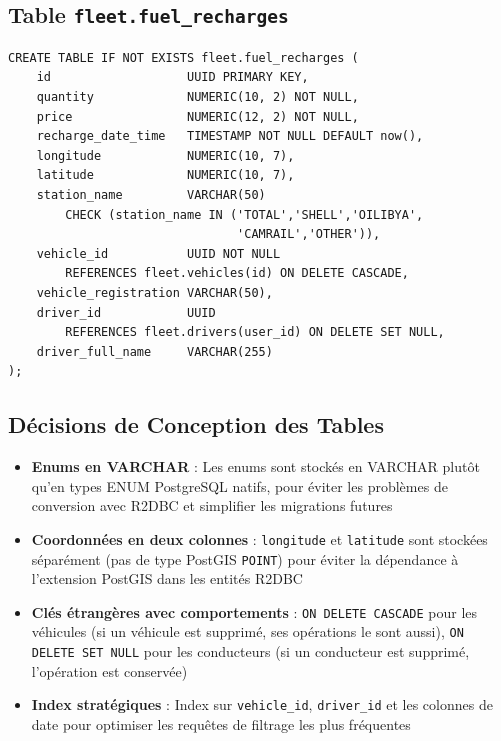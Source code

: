 \documentclass[12pt,a4paper]{report}
\begin{document}
\subsection{Table \texttt{fleet.fuel\_recharges}}

\begin{lstlisting}[style=sqlStyle, caption={Création de la table fleet.fuel\_recharges}]
CREATE TABLE IF NOT EXISTS fleet.fuel_recharges (
    id                   UUID PRIMARY KEY,
    quantity             NUMERIC(10, 2) NOT NULL,
    price                NUMERIC(12, 2) NOT NULL,
    recharge_date_time   TIMESTAMP NOT NULL DEFAULT now(),
    longitude            NUMERIC(10, 7),
    latitude             NUMERIC(10, 7),
    station_name         VARCHAR(50)
        CHECK (station_name IN ('TOTAL','SHELL','OILIBYA',
                                'CAMRAIL','OTHER')),
    vehicle_id           UUID NOT NULL
        REFERENCES fleet.vehicles(id) ON DELETE CASCADE,
    vehicle_registration VARCHAR(50),
    driver_id            UUID
        REFERENCES fleet.drivers(user_id) ON DELETE SET NULL,
    driver_full_name     VARCHAR(255)
);
\end{lstlisting}

\subsection{Décisions de Conception des Tables}

\begin{itemize}[leftmargin=2cm]
  \item \textbf{Enums en VARCHAR} : Les enums sont stockés en VARCHAR plutôt qu'en types ENUM PostgreSQL natifs, pour éviter les problèmes de conversion avec R2DBC et simplifier les migrations futures
  \item \textbf{Coordonnées en deux colonnes} : \texttt{longitude} et \texttt{latitude} sont stockées séparément (pas de type PostGIS \texttt{POINT}) pour éviter la dépendance à l'extension PostGIS dans les entités R2DBC
  \item \textbf{Clés étrangères avec comportements} : \texttt{ON DELETE CASCADE} pour les véhicules (si un véhicule est supprimé, ses opérations le sont aussi), \texttt{ON DELETE SET NULL} pour les conducteurs (si un conducteur est supprimé, l'opération est conservée)
  \item \textbf{Index stratégiques} : Index sur \texttt{vehicle\_id}, \texttt{driver\_id} et les colonnes de date pour optimiser les requêtes de filtrage les plus fréquentes
\end{itemize}
\end{document}

